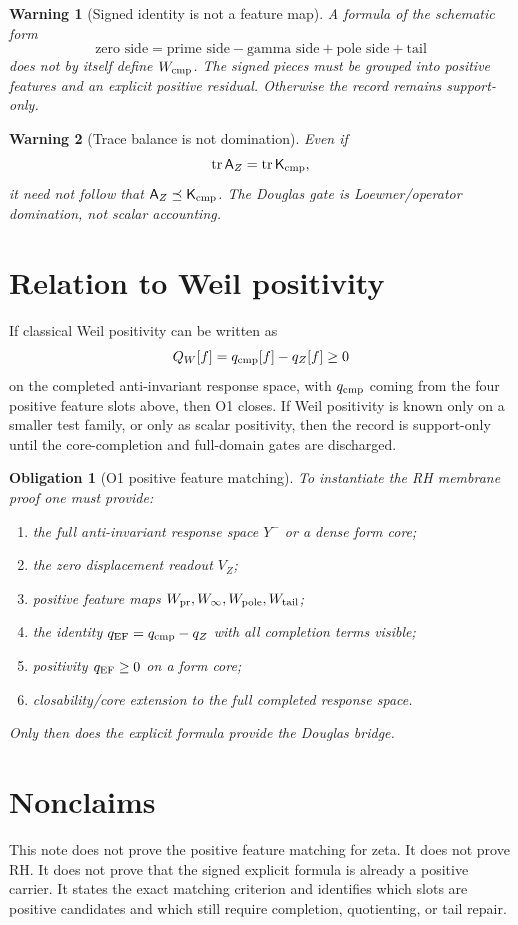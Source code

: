 \documentclass[11pt]{article}
\newtheorem{warning}{Warning}
\newtheorem{obligation}{Obligation}
\newcommand{\AZ}{\mathsf A_Z}
\newcommand{\Kcmp}{\mathsf K_{\rm cmp}}
\newcommand{\Yminus}{Y^-}
\newcommand{\Wcmp}{W_{\rm cmp}}
\newcommand{\Wpr}{W_{\rm pr}}
\newcommand{\Winfty}{W_\infty}
\newcommand{\Wpole}{W_{\rm pole}}
\newcommand{\Wtail}{W_{\rm tail}}
\begin{document}
\begin{warning}[Signed identity is not a feature map]
A formula of the schematic form
\[
\text{zero side}=\text{prime side}-\text{gamma side}+\text{pole side}+\text{tail}
\]
does not by itself define \(\Wcmp\). The signed pieces must be grouped into positive features and an explicit positive residual. Otherwise the record remains support-only.
\end{warning}

\begin{warning}[Trace balance is not domination]
Even if
\[
\operatorname{tr}\AZ=\operatorname{tr}\Kcmp,
\]
it need not follow that \(\AZ\preceq\Kcmp\). The Douglas gate is Loewner/operator domination, not scalar accounting.
\end{warning}

\section{Relation to Weil positivity}
If classical Weil positivity can be written as
\[
Q_W[f]=q_{\rm cmp}[f]-q_Z[f]\ge0
\]
on the completed anti-invariant response space, with \(q_{\rm cmp}\) coming from the four positive feature slots above, then O1 closes. If Weil positivity is known only on a smaller test family, or only as scalar positivity, then the record is support-only until the core-completion and full-domain gates are discharged.

\begin{obligation}[O1 positive feature matching]
To instantiate the RH membrane proof one must provide:
\begin{enumerate}[label=(O1.\arabic*)]
\item the full anti-invariant response space \(\Yminus\) or a dense form core;
\item the zero displacement readout \(V_Z\);
\item positive feature maps \(\Wpr,\Winfty,\Wpole,\Wtail\);
\item the identity \(q_{\rm EF}=q_{\rm cmp}-q_Z\) with all completion terms visible;
\item positivity \(q_{\rm EF}\ge0\) on a form core;
\item closability/core extension to the full completed response space.
\end{enumerate}
Only then does the explicit formula provide the Douglas bridge.
\end{obligation}

\section{Nonclaims}
This note does not prove the positive feature matching for zeta. It does not prove RH. It does not prove that the signed explicit formula is already a positive carrier. It states the exact matching criterion and identifies which slots are positive candidates and which still require completion, quotienting, or tail repair.
\end{document}
